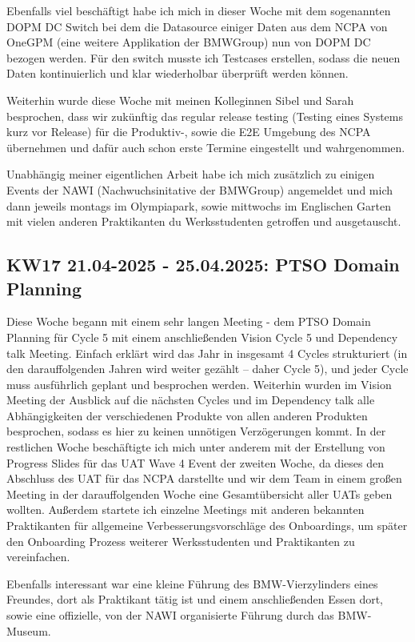 Ebenfalls viel beschäftigt habe ich mich in dieser Woche mit dem sogenannten \ac{DOPM DC} Switch bei dem die Datasource einiger Daten aus dem \ac{NCPA} von \ac{OneGPM} (eine weitere Applikation der BMWGroup) nun von \ac{DOPM DC} bezogen werden. 
Für den switch musste ich Testcases erstellen, sodass die neuen Daten kontinuierlich und klar wiederholbar überprüft werden können.

Weiterhin wurde diese Woche mit meinen Kolleginnen Sibel und Sarah besprochen, dass wir zukünftig das regular release testing (Testing eines Systems kurz vor Release) für die Produktiv-, sowie die \ac{E2E} Umgebung des \ac{NCPA} übernehmen und dafür auch schon erste Termine eingestellt und wahrgenommen.

Unabhängig meiner eigentlichen Arbeit habe ich mich zusätzlich zu einigen Events der \ac{NAWI} (Nachwuchsinitative der BMWGroup) angemeldet und mich dann jeweils montags im Olympiapark, sowie mittwochs im Englischen Garten mit vielen anderen Praktikanten du Werksstudenten getroffen und ausgetauscht.


\subsection{KW17 21.04-2025 - 25.04.2025: PTSO Domain Planning}
Diese Woche begann mit einem sehr langen Meeting - dem PTSO Domain Planning für Cycle 5 mit einem anschließenden Vision Cycle 5 und Dependency talk Meeting. 
Einfach erklärt wird das Jahr in insgesamt 4 Cycles strukturiert (in den darauffolgenden Jahren wird weiter gezählt – daher Cycle 5), und jeder Cycle muss ausführlich geplant und besprochen werden. 
Weiterhin wurden im Vision Meeting der Ausblick auf die nächsten Cycles und im Dependency talk alle Abhängigkeiten der verschiedenen Produkte von allen anderen Produkten besprochen, sodass es hier zu keinen unnötigen Verzögerungen kommt. 
In der restlichen Woche beschäftigte ich mich unter anderem mit der Erstellung von Progress Slides für das \ac{UAT} Wave 4 Event der zweiten Woche, da dieses den Abschluss des \ac{UAT} für das \ac{NCPA} darstellte und wir dem Team in einem großen Meeting in der darauffolgenden Woche eine Gesamtübersicht aller \acp{UAT} geben wollten. 
Außerdem startete ich einzelne Meetings mit anderen bekannten Praktikanten für allgemeine Verbesserungsvorschläge des Onboardings, um später den Onboarding Prozess weiterer Werksstudenten und Praktikanten zu vereinfachen.

Ebenfalls interessant war eine kleine Führung des BMW-Vierzylinders eines Freundes, dort als Praktikant tätig ist und einem anschließenden Essen dort, sowie eine offizielle, von der \ac{NAWI} organisierte Führung durch das BMW-Museum.

